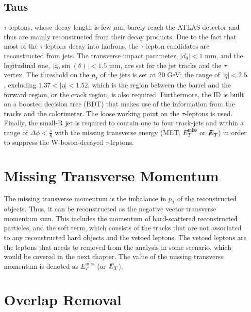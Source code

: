 \documentclass[class=NCU_thesis, crop=false]{standalone}
\begin{document}
	\subsection{Taus}
		$\tau$-leptons, whose decay length is few $\mu$m, barely reach the ATLAS detector and thus are mainly reconstructed from their decay products. Due to the fact that most of the $\tau$-leptons decay into hadrons, the $\tau$-lepton candidates are reconstructed from jets. The transverse impact parameter, $\lvert d_0 \rvert < 1$ mm, and the logitudinal one, $\lvert z_0 \sin(\theta) \rvert < 1.5$ mm, are set for the jet tracks and the $\tau$ vertex. The threshold on the $p_T$ of the jets is set at 20 GeV; the range of $\lvert \eta \rvert < 2.5$, excluding $1.37 < \lvert \eta \rvert < 1.52$, which is the region between the barrel and the forward region, or the crack region, is also required. Furthermore, the ID is built on a boosted decision tree (BDT) that makes use of the information from the tracks and the calorimeter. The loose working point on the $\tau$-leptons is used. Finally, the small-R jet is required to contain one to four track-jets and within a range of $\Delta \phi < \frac{\pi}{8}$ with the missing transverse energy (MET, $E_T^{\mathrm{miss}}$ or $\slashed{E}_T$) in order to suppress the W-boson-decayed $\tau$-leptons.
	
\section{Missing Transverse Momentum}
	The missing transverse momentum is the imbalance in $p_T$ of the reconstructed objects. Thus, it can be reconstructed as the negative vector transverse momentum sum. This includes the momentum of hard-scattered reconstructed particles, and the soft term, which consists of the tracks that are not associated to any reconstructed hard objects and the vetoed leptons. The vetoed leptons are the leptons that needs to removed from the analysis in some scenario, which would be covered in the next chapter. The value of the missing transverse momentum is denoted as $E_T^{\mathrm{miss}}$ (or $\slashed{E}_T$).
	
\section{Overlap Removal}
\end{document}
